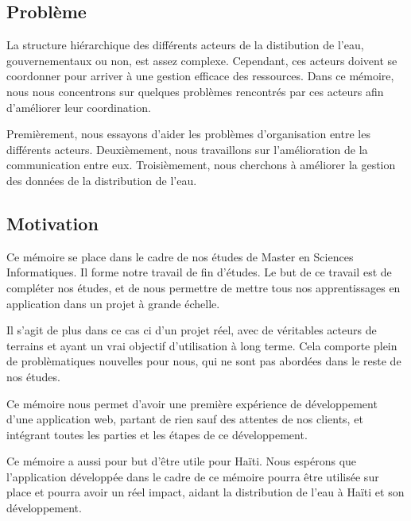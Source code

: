 \documentclass{eplmastersthesis_FR}
\begin{document}
		\subsection*{Problème}

			La structure hiérarchique des différents acteurs de la distibution de l'eau, gouvernementaux ou non, est assez complexe. Cependant, ces acteurs doivent se coordonner pour arriver à une gestion efficace des ressources. Dans ce mémoire, nous nous concentrons sur quelques problèmes rencontrés par ces acteurs afin d'améliorer leur coordination.

			Premièrement, nous essayons d'aider les problèmes d'organisation entre les différents acteurs. Deuxièmement, nous travaillons sur l'amélioration de la communication entre eux. Troisièmement, nous cherchons à améliorer la gestion des données de la distribution de l'eau. %


		\subsection*{Motivation}

			Ce mémoire se place dans le cadre de nos études de Master en Sciences Informatiques. Il forme notre travail de fin d'études. Le but de ce travail est de compléter nos études, et de nous permettre de mettre tous nos apprentissages en application dans un projet à grande échelle.

			Il s'agit de plus dans ce cas ci d'un projet réel, avec de véritables acteurs de terrains et ayant un vrai objectif d'utilisation à long terme. Cela comporte plein de problèmatiques nouvelles pour nous, qui ne sont pas abordées dans le reste de nos études.

			Ce mémoire nous permet d'avoir une première expérience de développement d'une application web, partant de rien sauf des attentes de nos clients, et intégrant toutes les parties et les étapes de ce développement.

			Ce mémoire a aussi pour but d'être utile pour Haïti. Nous espérons que l'application développée dans le cadre de ce mémoire pourra être utilisée sur place et pourra avoir un réel impact, aidant la distribution de l'eau à Haïti et son développement.

\end{document}
